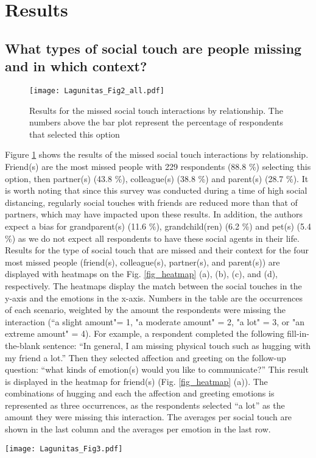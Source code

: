 \documentclass[acmsmall]{acmart}
\begin{document}
\section{Results}
\subsection{What types of social touch are people missing and in which context?}
\label{sec_missing}

\begin{figure}[!t]
	\centering
	\texttt{[image: Lagunitas\_Fig2\_all.pdf]}
	\caption{Results for the missed social touch interactions by relationship. The numbers above the bar plot represent the percentage of respondents that selected this option}
	\label{fig_peopleMissed}
\end{figure}

Figure \ref{fig_peopleMissed} shows the results of the missed social touch interactions by relationship. Friend(s) are the most missed people with 229 respondents (88.8 \%) selecting this option, then partner(s) (43.8 \%), colleague(s) (38.8 \%) and parent(s) (28.7 \%). It is worth noting that since this survey was conducted during a time of high social distancing, regularly social touches with friends are reduced more than that of partners, which may have impacted upon these results. In addition, the authors expect a bias for grandparent(s) (11.6 \%), grandchild(ren) (6.2 \%) and pet(s) (5.4 \%) as we do not expect all respondents to have these social agents in their life.
Results for the type of social touch that are missed and their context for the four most missed people (friend(s), colleague(s), partner(s), and parent(s)) are displayed with heatmaps on the Fig. \ref{fig_heatmap} (a), (b), (c), and (d), respectively. The heatmaps display the match between the social touches in the y-axis and the emotions in the x-axis. Numbers in the table are the occurrences of each scenario, weighted by the amount the respondents were missing the interaction (“a slight amount"= 1, "a moderate amount" = 2, "a lot" = 3, or "an extreme amount" = 4). For example, a respondent completed the following fill-in-the-blank sentence: “In general, I am missing physical touch such as hugging with my friend a lot.” Then they selected affection and greeting on the follow-up question: “what kinds of emotion(s) would you like to communicate?” This result is displayed in the heatmap for friend(s) (Fig. \ref{fig_heatmap} (a)). The combinations of hugging and each the affection and greeting emotions is represented as three occurrences, as the respondents selected “a lot” as the amount they were missing this interaction. The averages per social touch are shown in the last column and the averages per emotion in the last row. 
\begin{figure*}[!t]
	\centering
	\texttt{[image: Lagunitas\_Fig3.pdf]}
	\caption{Heatmap representing the weighted occurrences of each social touch interaction scenarios that are missed by the respondents with (a) their friends, (b) their colleagues, (c) their partner, and (d) their parents}
	\label{fig_heatmap}
\end{figure*}
\end{document}
